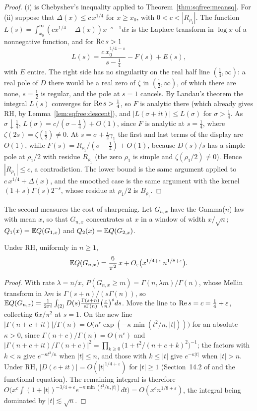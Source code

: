 \begin{proof}
(i) is Chebyshev's inequality applied to Theorem~\ref{thm:sqfree:meansq}. For (ii) suppose that $\Delta(x)\le c\,x^{1/4}$ for $x\ge x_0$, with $0<c<|R_{\rho_1}|$. The function $L(s)=\int_{x_0}^\infty(cx^{1/4}-\Delta(x))x^{-s-1}dx$ is the Laplace transform in $\log x$ of a nonnegative function, and for $\operatorname{Re} s>1$
\[
L(s)=\frac{c\,x_0^{1/4-s}}{s-\frac14}-F(s)+E(s),
\]
with $E$ entire. The right side has no singularity on the real half line $(\frac14,\infty)$: a real pole of $D$ there would be a real zero of $\zeta$ in $(\frac12,\infty)$, of which there are none, $s=\frac12$ is regular, and the pole at $s=1$ cancels. By Landau's theorem the integral $L(s)$ converges for $\operatorname{Re} s>\frac14$, so $F$ is analytic there (which already gives RH, by Lemma~\ref{lem:sqfree:descent}), and $|L(\sigma+it)|\le L(\sigma)$ for $\sigma>\frac14$. As $\sigma\downarrow\frac14$, $L(\sigma)=c/(\sigma-\frac14)+O(1)$, since $F$ is analytic at $s=\frac14$, where $\zeta(2s)=\zeta(\frac12)\ne0$. At $s=\sigma+\frac i2\gamma_1$ the first and last terms of the display are $O(1)$, while $F(s)=R_{\rho_1}/(\sigma-\frac14)+O(1)$, because $D(s)/s$ has a simple pole at $\rho_1/2$ with residue $R_{\rho_1}$ (the zero $\rho_1$ is simple and $\zeta(\rho_1/2)\ne0$). Hence $|R_{\rho_1}|\le c$, a contradiction. The lower bound is the same argument applied to $c\,x^{1/4}+\Delta(x)$, and the smoothed case is the same argument with the kernel $(1+s)\Gamma(s)2^{-s}$, whose residue at $\rho_1/2$ is $B_{\rho_1}$.
\end{proof}

The second measures the cost of sharpening. Let $G_{n,x}$ have the Gamma($n$) law with mean $x$, so that $G_{n,x}$ concentrates at $x$ in a window of width $x/\sqrt n$; $Q_1(x)=\mathbb{E} Q(G_{1,x})$ and $Q_2(x)=\mathbb{E} Q(G_{2,x})$.

\begin{proposition}\label{prop:sqfree:gamman}
Under RH, uniformly in $n\ge1$,
\[
\mathbb{E} Q(G_{n,x})=\frac6{\pi^2}\,x+O_\varepsilon\big(x^{1/4+\varepsilon}\,n^{1/8+\varepsilon}\big).
\]
\end{proposition}

\begin{proof}
With rate $\lambda=n/x$, $P(G_{n,x}\ge m)=\Gamma(n,\lambda m)/\Gamma(n)$, whose Mellin transform in $\lambda m$ is $\Gamma(s+n)/(s\Gamma(n))$, so $\mathbb{E} Q(G_{n,x})=\frac1{2\pi i}\int_{(2)}D(s)\frac{\Gamma(s+n)}{s\Gamma(n)}\big(\frac xn\big)^sds$. Move the line to $\operatorname{Re} s=c=\frac14+\varepsilon$, collecting $6x/\pi^2$ at $s=1$. On the new line $|\Gamma(n+c+it)|/\Gamma(n)=O\big(n^c\exp(-\kappa\min(t^2/n,|t|))\big)$ for an absolute $\kappa>0$, since $\Gamma(n+c)/\Gamma(n)=O(n^c)$ and $|\Gamma(n+c+it)/\Gamma(n+c)|^2=\prod_{k\ge0}\big(1+t^2/(n+c+k)^2\big)^{-1}$; the factors with $k<n$ give $e^{-\kappa t^2/n}$ when $|t|\le n$, and those with $k\le|t|$ give $e^{-\kappa|t|}$ when $|t|>n$. Under RH, $|D(c+it)|=O(|t|^{1/4+\varepsilon})$ for $|t|\ge1$ (Section~14.2 of \cite{Titchmarsh} and the functional equation). The remaining integral is therefore $O\big(x^c\int(1+|t|)^{-3/4+\varepsilon}e^{-\kappa\min(t^2/n,|t|)}dt\big)=O(x^cn^{1/8+\varepsilon})$, the integral being dominated by $|t|\lesssim\sqrt n$.
\end{proof}

